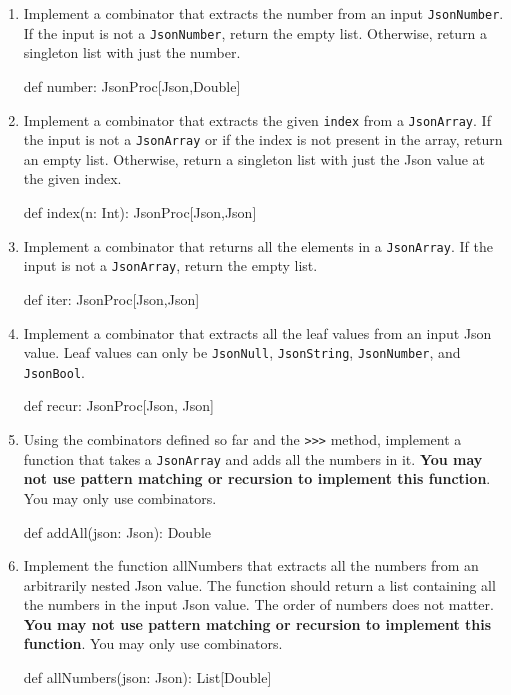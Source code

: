 \begin{enumerate}
    \item Implement a combinator that extracts the number from an input
    \texttt{JsonNumber}. If the input is not a \texttt{JsonNumber}, return the
    empty list. Otherwise, return a singleton list with just the number.
    \begin{scalacode}
    def number: JsonProc[Json,Double]
    \end{scalacode}

    \item Implement a combinator that extracts the given \texttt{index} from
    a \texttt{JsonArray}. If the input is not a \texttt{JsonArray} or if the index
    is not present in the array, return an empty list. Otherwise, return
    a singleton list with just the Json value at the given index.
    \begin{scalacode}
    def index(n: Int): JsonProc[Json,Json]
    \end{scalacode}

    \item Implement a combinator that returns all the elements in a
    \texttt{JsonArray}. If the input is not a \texttt{JsonArray}, return the
    empty list.
    \begin{scalacode}
    def iter: JsonProc[Json,Json]
    \end{scalacode}

    \item Implement a combinator that extracts all the leaf values from an
    input Json value. Leaf values can only be \texttt{JsonNull},
    \texttt{JsonString}, \texttt{JsonNumber}, and \texttt{JsonBool}.
    \begin{scalacode}
    def recur: JsonProc[Json, Json]
    \end{scalacode}

    \item Using the combinators defined so far and the \texttt{>>>} method,
    implement a function that takes a \texttt{JsonArray} and adds all the
    numbers in it. \textbf{You may not use pattern matching or recursion to
    implement this function}. You may only use combinators.
    \begin{scalacode}
    def addAll(json: Json): Double
    \end{scalacode}

    \item Implement the function allNumbers that extracts all the numbers from
    an arbitrarily nested Json value. The function should return a list containing
    all the numbers in the input Json value. The order of numbers does not
    matter. \textbf{You may not use pattern matching or recursion to
    implement this function}. You may only use
    combinators.
    \begin{scalacode}
    def allNumbers(json: Json): List[Double]
    \end{scalacode}


\end{enumerate}
